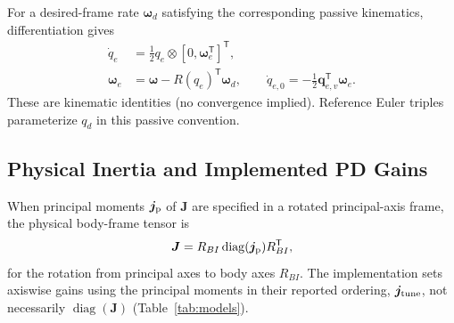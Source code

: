 \documentclass[letterpaper, 10 pt, conference]{ieeeconf}
\newcommand{\T}{^{\mathsf T}}
\begin{document}
For a desired-frame rate $\bm\omega_d$ satisfying the corresponding passive kinematics, differentiation gives
\begin{align}
 \dot q_e&=\tfrac12q_e\otimes[0,\bm\omega_e\T]\T,\\
 \bm\omega_e&=\bm\omega-R(q_e)\T\bm\omega_d,\qquad
 \dot q_{e,0}=-\tfrac12\bm q_{e,v}\T\bm\omega_e.
 \label{eq:errkin}
\end{align}
These are kinematic identities (no convergence implied). Reference Euler triples parameterize $q_d$ in this passive convention.

\subsection{Physical Inertia and Implemented PD Gains}
When principal moments $\bm j_{\rm p}$ of $\bm J$ are specified in a rotated principal-axis frame, the physical body-frame tensor is
\begin{equation}
 \bm J=R_{BI}\operatorname{diag}(\bm j_{\rm p})R_{BI}\T,
 \label{eq:inertiaframe}
\end{equation}
for the rotation from principal axes to body axes $R_{BI}$. The implementation sets axiswise gains using the principal moments in their reported ordering, $\bm j_{\rm tune}$, not necessarily $\operatorname{diag}(\bm J)$ (Table~\ref{tab:models}).
\end{document}
